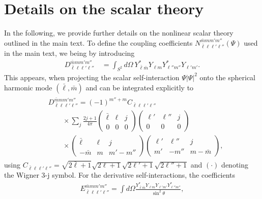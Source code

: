 \documentclass[aps,prl,notitlepage,superscriptaddress,twocolumn]{revtex4-1}
\begin{document}



\appendix
\section{Details on the scalar theory} \label{app:theory}

In the following, we provide further details on the nonlinear scalar theory outlined in the main text. To define the coupling coefficients $N^{\bar{m}mm'm''}_{\bar{\ell}\ell\ell'\ell''}(\Psi)$ used in the main text, we being by introducing
\begin{align}
D^{\bar{m}mm'm''}_{\bar{\ell}\ell\ell'\ell''} \ & =\int_{S^2} d\Omega \ Y^*_{\bar{\ell}\bar{m}}Y_{\ell m}Y^*_{\ell'' m''}Y_{\ell'm'}.
\end{align}
This appears, when projecting the scalar self-interaction $\Psi |\Psi|^2$ onto the spherical harmonic mode $(\bar{\ell},\bar{m})$ and can be integrated explicitly to
\begin{align}
\begin{aligned}
 & \ D^{\bar{m}mm'm''}_{\bar{\ell}\ell\ell'\ell''} = (-1)^{m''+m}C_{\bar{\ell}\ell\ell'\ell''} \\
& \ \qquad \times \sum_j\frac{2j+1}{4\pi}
\begin{pmatrix}
\bar{\ell} & \ell & j \\
0 & 0 & 0
\end{pmatrix}
\begin{pmatrix}
\ell' & \ell'' & j \\
0 & 0 & 0
\end{pmatrix}
\\
& \ \qquad \times
\begin{pmatrix}
\bar{\ell} & \ell & j \\
-\bar{m} & m & m'-m''
\end{pmatrix}
\begin{pmatrix}
\ell' & \ell'' & j \\
m' & -m'' & m-\bar{m}
\end{pmatrix},
\end{aligned}
\label{eq:Dllll}
\end{align}
using $C_{\bar{\ell}\ell\ell'\ell''}=\sqrt{2\bar{\ell}+1}\sqrt{2\ell+1}\sqrt{2\ell'+1}\sqrt{2\ell''+1}$ and $(\cdot)$ denoting the Wigner 3-j symbol. For the derivative self-interactions, the coefficients
\begin{align}
E^{\bar{m}mm'm''}_{\bar{\ell}\ell\ell'\ell''}=\int d\Omega \frac{Y^*_{\bar{\ell}\bar{m}}Y_{\ell m} Y_{\ell' m'}Y^*_{\ell'' m''}}{\sin^2\theta},
\label{eq:integralE}
\end{align}
\end{document}
